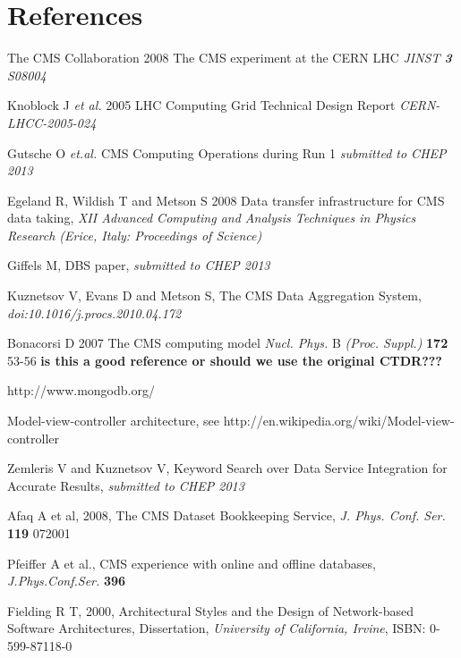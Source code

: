 \section*{References}

\begin{thebibliography}{1}
The CMS Collaboration 2008 The CMS experiment at the CERN LHC {\it JINST {\bf 3} S08004}

Knoblock J {\it et al.} 2005 LHC Computing Grid Technical Design Report {\it CERN-LHCC-2005-024}

 Gutsche O {\it et.al.} CMS Computing Operations during Run 1 {\it submitted to CHEP 2013}

  Egeland R, Wildish T and Metson S 2008 Data transfer infrastructure for CMS data taking,  {\it XII Advanced Computing and Analysis Techniques in Physics Research (Erice, Italy: Proceedings of Science)}

Giffels M, DBS paper, {\it submitted to CHEP 2013}

Kuznetsov V, Evans D and Metson S, The CMS Data Aggregation System,
{\it doi:10.1016/j.procs.2010.04.172}

 Bonacorsi D 2007 The CMS computing model {\it Nucl. Phys.} B {\it (Proc. Suppl.)} {\bf 172} 53-56
{\bf is this a good reference or should we use the original CTDR???}

http://www.mongodb.org/

 Model-view-controller architecture, see
http://en.wikipedia.org/wiki/Model-view-controller

 Zemleris V and Kuznetsov V,
Keyword Search over Data Service Integration for Accurate Results,
{\it submitted to CHEP 2013}

 Afaq A et al, 2008, The CMS Dataset Bookkeeping Service, 
{\it J. Phys. Conf. Ser.} 
{\bf 119} 072001

 Pfeiffer A et al., CMS experience with online and offline databases, 
{\it J.Phys.Conf.Ser.} 
{\bf 396}

 Fielding R T, 2000, Architectural Styles and the Design of Network-based Software Architectures, Dissertation, 
{\it University of California, Irvine}, 
ISBN: 0-599-87118-0

\end{thebibliography}
